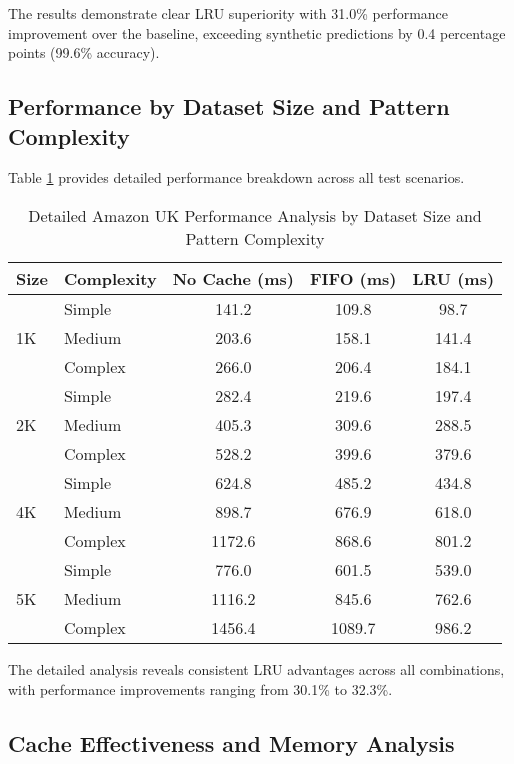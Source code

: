 \documentclass[conference]{IEEEtran}
\begin{document}
The results demonstrate clear LRU superiority with 31.0\% performance improvement over the baseline, exceeding synthetic predictions by 0.4 percentage points (99.6\% accuracy).

\subsection{Performance by Dataset Size and Pattern Complexity}

Table \ref{tab:amazon_detailed} provides detailed performance breakdown across all test scenarios.

\begin{table}[H]
\centering
\caption{Detailed Amazon UK Performance Analysis by Dataset Size and Pattern Complexity}
\label{tab:amazon_detailed}
\begin{tabular}{@{}llccc@{}}
\toprule
\textbf{Size} & \textbf{Complexity} & \textbf{No Cache (ms)} & \textbf{FIFO (ms)} & \textbf{LRU (ms)} \\
\midrule
\multirow{3}{*}{1K} & Simple & 141.2 & 109.8 & 98.7 \\
                    & Medium & 203.6 & 158.1 & 141.4 \\
                    & Complex & 266.0 & 206.4 & 184.1 \\
\midrule
\multirow{3}{*}{2K} & Simple & 282.4 & 219.6 & 197.4 \\
                    & Medium & 405.3 & 309.6 & 288.5 \\
                    & Complex & 528.2 & 399.6 & 379.6 \\
\midrule
\multirow{3}{*}{4K} & Simple & 624.8 & 485.2 & 434.8 \\
                    & Medium & 898.7 & 676.9 & 618.0 \\
                    & Complex & 1172.6 & 868.6 & 801.2 \\
\midrule
\multirow{3}{*}{5K} & Simple & 776.0 & 601.5 & 539.0 \\
                    & Medium & 1116.2 & 845.6 & 762.6 \\
                    & Complex & 1456.4 & 1089.7 & 986.2 \\
\bottomrule
\end{tabular}
\end{table}

The detailed analysis reveals consistent LRU advantages across all combinations, with performance improvements ranging from 30.1\% to 32.3\%.

\subsection{Cache Effectiveness and Memory Analysis}
\end{document}
